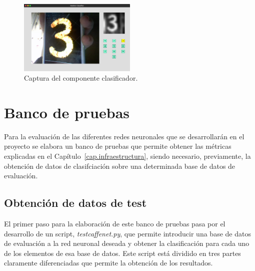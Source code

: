 \begin{figure}[H]
	\begin{center}
		\includegraphics[width=0.5\textwidth]{figures/componente1}
		\caption{Captura del componente clasificador.}
		\label{fig.componente1}
	\end{center}
\end{figure}
\vspace{30pt}
\section{Banco de pruebas} \label{sec.banco}
Para la evaluación de las diferentes redes neuronales que se desarrollarán en el proyecto se elabora un banco de pruebas que permite obtener las métricas explicadas en el Capítulo~\ref{cap.infraestructura}, siendo necesario, previamente, la obtención de datos de clasifciación sobre una determinada base de datos de evaluación.
\subsection{Obtención de datos de test}
El primer paso para la elaboración de este banco de pruebas pasa por el desarrollo de un script, \textit{testcaffenet.py}, que permite introducir una base de datos de evaluación a la red neuronal deseada y obtener la clasificación para cada uno de los elementos de esa base de datos. Este script está dividido en tres partes claramente diferenciadas que permite la obtención de los resultados.\\

